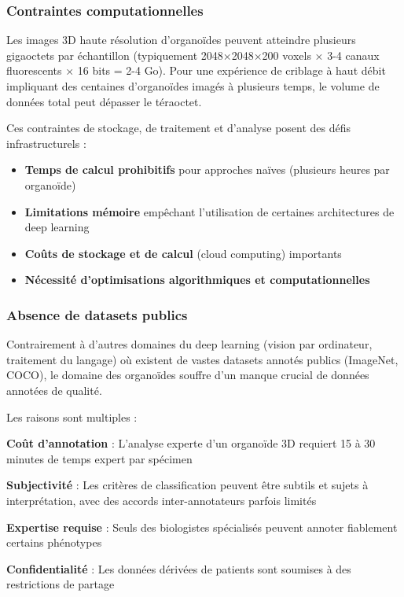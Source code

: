 \subsubsection{Contraintes computationnelles}

Les images 3D haute résolution d'organoïdes peuvent atteindre plusieurs gigaoctets par échantillon (typiquement 2048×2048×200 voxels × 3-4 canaux fluorescents × 16 bits = 2-4 Go). Pour une expérience de criblage à haut débit impliquant des centaines d'organoïdes imagés à plusieurs temps, le volume de données total peut dépasser le téraoctet.

Ces contraintes de stockage, de traitement et d'analyse posent des défis infrastructurels :
\begin{itemize}
    \item \textbf{Temps de calcul prohibitifs} pour approches naïves (plusieurs heures par organoïde)
    \item \textbf{Limitations mémoire} empêchant l'utilisation de certaines architectures de deep learning
    \item \textbf{Coûts de stockage et de calcul} (cloud computing) importants
    \item \textbf{Nécessité d'optimisations algorithmiques et computationnelles}
\end{itemize}

\subsubsection{Absence de datasets publics}

Contrairement à d'autres domaines du deep learning (vision par ordinateur, traitement du langage) où existent de vastes datasets annotés publics (ImageNet, COCO), le domaine des organoïdes souffre d'un manque crucial de données annotées de qualité.

Les raisons sont multiples :

\textbf{Coût d'annotation} : L'analyse experte d'un organoïde 3D requiert 15 à 30 minutes de temps expert par spécimen

\textbf{Subjectivité} : Les critères de classification peuvent être subtils et sujets à interprétation, avec des accords inter-annotateurs parfois limités
    
\textbf{Expertise requise} : Seuls des biologistes spécialisés peuvent annoter fiablement certains phénotypes

\textbf{Confidentialité} : Les données dérivées de patients sont soumises à des restrictions de partage

